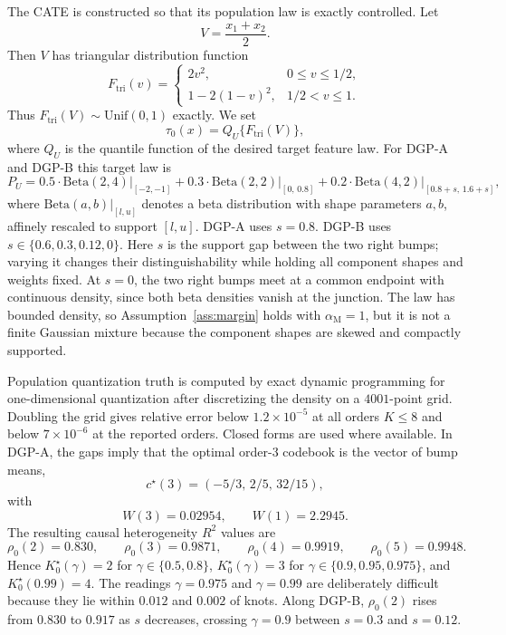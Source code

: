 \documentclass[11pt]{article}
\newcommand{\am}{\alpha_{\mathrm M}}
\begin{document}
The CATE is constructed so that its population law is exactly controlled.  Let
\[
V=\frac{x_1+x_2}{2}.
\]
Then $V$ has triangular distribution function
\[
F_{\mathrm{tri}}(v)
=
\begin{cases}
2v^2, & 0\le v\le 1/2,\\
1-2(1-v)^2, & 1/2<v\le1.
\end{cases}
\]
Thus $F_{\mathrm{tri}}(V)\sim\mathrm{Unif}(0,1)$ exactly.  We set
\[
\tau_0(x)=Q_U\{F_{\mathrm{tri}}(V)\},
\]
where $Q_U$ is the quantile function of the desired target feature law.  For DGP-A and DGP-B this target law is
\[
P_U
=
0.5\cdot\mathrm{Beta}(2,4)\vert_{[-2,-1]}
+
0.3\cdot\mathrm{Beta}(2,2)\vert_{[0,\,0.8]}
+
0.2\cdot\mathrm{Beta}(4,2)\vert_{[0.8+s,\,1.6+s]},
\]
where $\mathrm{Beta}(a,b)\vert_{[l,u]}$ denotes a beta distribution with shape parameters $a,b$, affinely rescaled to support $[l,u]$.  DGP-A uses $s=0.8$.  DGP-B uses $s\in\{0.6,0.3,0.12,0\}$.
Here $s$ is the support gap between the two right bumps; varying it changes their distinguishability while holding all component shapes and weights fixed.
At $s=0$, the two right bumps meet at a common endpoint with continuous density, since both beta densities vanish at the junction.  The law has bounded density, so Assumption~\ref{ass:margin} holds with $\am=1$, but it is not a finite Gaussian mixture because the component shapes are skewed and compactly supported.

Population quantization truth is computed by exact dynamic programming for one-dimensional quantization after discretizing the density on a $4001$-point grid.  Doubling the grid gives relative error below $1.2\times10^{-5}$ at all orders $K\le8$ and below $7\times10^{-6}$ at the reported orders.  Closed forms are used where available.  In DGP-A, the gaps imply that the optimal order-3 codebook is the vector of bump means,
\[
c^\star(3)=(-5/3,\,2/5,\,32/15),
\]
with
\[
W(3)=0.02954,
\qquad
W(1)=2.2945.
\]
The resulting causal heterogeneity $R^2$ values are
\[
\rho_0(2)=0.830,\qquad
\rho_0(3)=0.9871,\qquad
\rho_0(4)=0.9919,\qquad
\rho_0(5)=0.9948.
\]
Hence $K^\star_0(\gamma)=2$ for $\gamma\in\{0.5,0.8\}$, $K^\star_0(\gamma)=3$ for $\gamma\in\{0.9,0.95,0.975\}$, and $K^\star_0(0.99)=4$.  The readings $\gamma=0.975$ and $\gamma=0.99$ are deliberately difficult because they lie within $0.012$ and $0.002$ of knots.  Along DGP-B, $\rho_0(2)$ rises from $0.830$ to $0.917$ as $s$ decreases, crossing $\gamma=0.9$ between $s=0.3$ and $s=0.12$.
\end{document}
